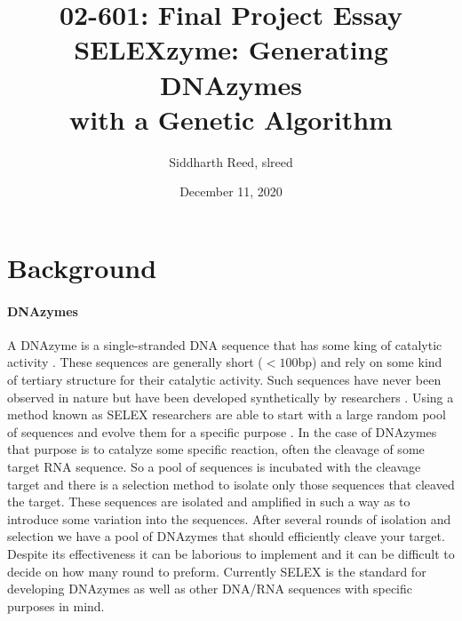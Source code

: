 \documentclass[11pt]{article}
\begin{document}
\title{{\Huge02-601: Final Project Essay}\\
        SELEXzyme: Generating DNAzymes \\
        with a Genetic Algorithm}
\author{Siddharth Reed, slreed}
\date{December 11, 2020}
\maketitle
\section*{Background}
\paragraph{\textbf{DNAzymes}}
A DNAzyme is a single-stranded DNA sequence that has some king of catalytic activity \citep{dnazyme}.
These sequences are generally short ($< 100$bp) and rely on some kind of tertiary structure for their catalytic activity.
Such sequences have never been observed in nature but have been developed synthetically by researchers \citep{selex}.
Using a method known as SELEX researchers are able to start with a large random pool of sequences and evolve them for a specific purpose \citep{selex}.
In the case of DNAzymes that purpose is to catalyze some specific reaction, often the cleavage of some target RNA sequence.
So a pool of sequences is incubated with the cleavage target and there is a selection method to isolate only those sequences that cleaved the target.
These sequences are isolated and amplified in such a way as to introduce some variation into the sequences.
After several rounds of isolation and selection we have a pool of DNAzymes that should efficiently cleave your target.
Despite its effectiveness it can be laborious to implement and it can be difficult to decide on how many round to preform.
Currently SELEX is the standard for developing DNAzymes as well as other DNA/RNA sequences with specific purposes in mind.
\end{document}
